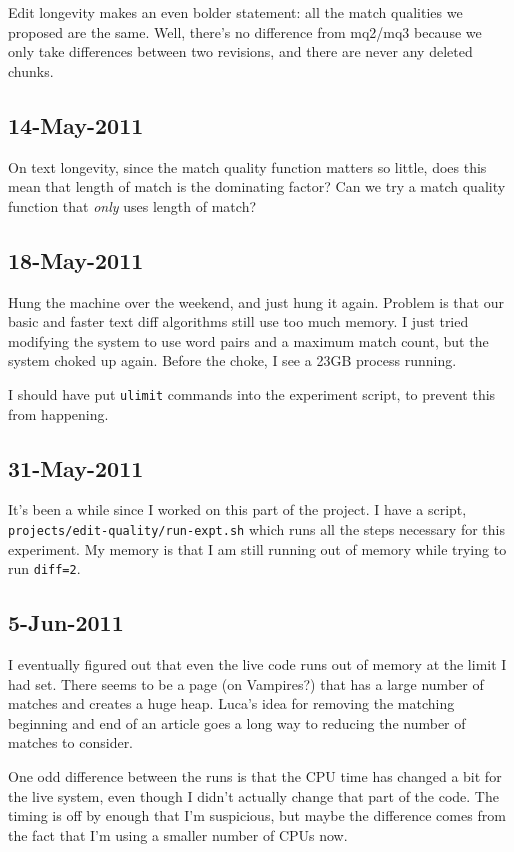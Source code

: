 Edit longevity makes an even bolder statement: all the
match qualities we proposed are the same.
Well, there's no difference from mq2/mq3 because we only
take differences between two revisions, and there are never
any deleted chunks.

\subsection{14-May-2011}

On text longevity, since the match quality function matters so little,
does this mean that length of match is the dominating factor?
Can we try a match quality function that \textit{only} uses
length of match?

\subsection{18-May-2011}

Hung the machine over the weekend, and just hung it again.
Problem is that our basic and faster text diff algorithms
still use too much memory.
I just tried modifying the system to use word pairs and
a maximum match count, but the system choked up again.
Before the choke, I see a 23GB process running.

I should have put \texttt{ulimit} commands into the
experiment script, to prevent this from happening.

\subsection{31-May-2011}

It's been a while since I worked on this part of the project.
I have a script,
\texttt{projects/edit-quality/run-expt.sh} which runs all
the steps necessary for this experiment.
My memory is that I am still running out of memory while
trying to run \texttt{diff=2}.

\subsection{5-Jun-2011}

I eventually figured out that even the live code runs out of memory
at the limit I had set.
There seems to be a page (on Vampires?) that has a large number
of matches and creates a huge heap.
Luca's idea for removing the matching beginning and end of
an article goes a long way to reducing the number of matches
to consider.

One odd difference between the runs is that the CPU time
has changed a bit for the live system, even though I didn't
actually change that part of the code.
The timing is off by enough that I'm suspicious, but maybe the
difference comes from the fact that I'm using a smaller number
of CPUs now.


